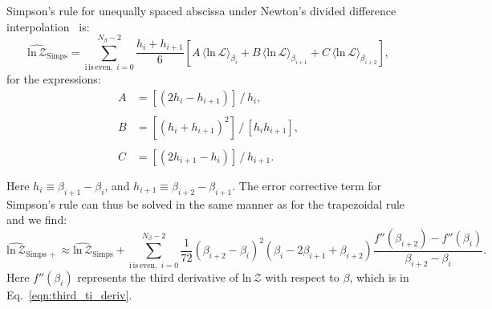Simpson's rule for unequally spaced abscissa under Newton's divided difference interpolation~\citep{easa1988area} is:
\begin{equation}
    \widehat{\mathrm{ln} \, \mathcal{Z}}_{\mathrm{Simps}} = \sum_{\mathrm{i\, is\, even}, \, \, i=0}^{N_\beta-2} \frac{h_i + h_{i+1}}{6} \left [ A \, \langle \mathrm{ln} \, \mathcal{L} \rangle_{\beta_{i}} + B \, \langle \mathrm{ln} \, \mathcal{L} \rangle_{\beta_{i+1}} + C \, \langle \mathrm{ln} \, \mathcal{L} \rangle_{\beta_{i+2}}\right ],
\end{equation}
for the expressions:
\begin{equation}
\begin{array}{lll}
     A &= \left [(2h_i - h_{i+1})\right] \, / \, h_i, \\ \\ 
     B &= \left [(h_i+h_{i+1})^2 \right] \, / \, \left[h_i h_{i+1}\right], \\ \\
     C &= \left [(2h_{i+1} - h_i)\right] \, / \, h_{i+1}. \\ \\
\end{array}
\end{equation}
Here  $h_i \equiv \beta_{i+1} - \beta_i$, and $h_{i+1} \equiv \beta_{i+2} - \beta_{i+1}$. The error corrective term for Simpson's rule can thus be solved in the same manner as for the trapezoidal rule and we find:
\begin{equation}
    \widehat{\mathrm{ln} \, \mathcal{Z}}_{\mathrm{Simps \, +}} \approx \widehat{\mathrm{ln} \, \mathcal{Z}}_{\mathrm{Simps}} + \sum_{\mathrm{i\, is\, even}, \, \, i=0}^{N_\beta-2} \frac{1}{72}\left(\beta_{i+2} - \beta_{i} \right)^2 (\beta_i - 2\beta_{i+1} + \beta_{i+2})\frac{f''(\beta_{i+2}) - f''(\beta_i)}{\beta_{i+2} - \beta_i}.
\end{equation}
Here $f''(\beta_i)$ represents the third derivative of $\mathrm{ln} \, \mathcal{Z}$ with respect to $\beta$, which is in Eq.~\ref{eqn:third_ti_deriv}.

